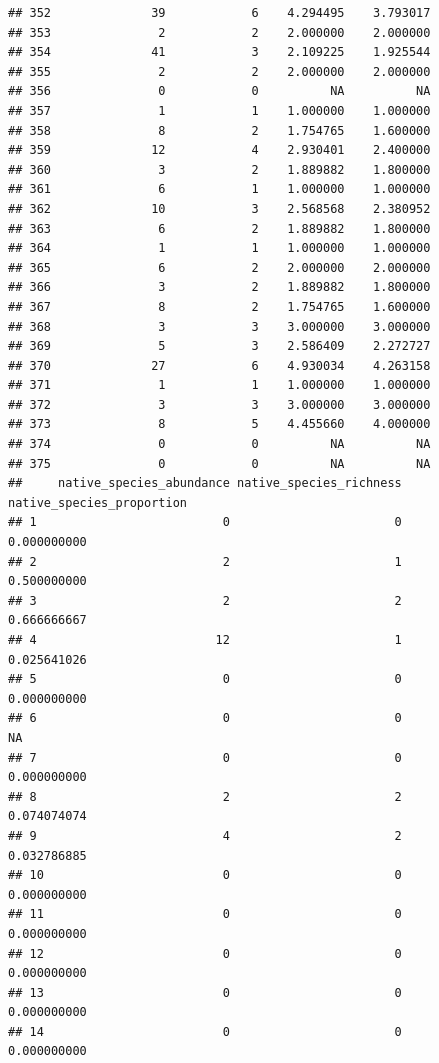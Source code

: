 \documentclass[
]{article}
\begin{document}
\begin{verbatim}
## 352              39            6    4.294495    3.793017
## 353               2            2    2.000000    2.000000
## 354              41            3    2.109225    1.925544
## 355               2            2    2.000000    2.000000
## 356               0            0          NA          NA
## 357               1            1    1.000000    1.000000
## 358               8            2    1.754765    1.600000
## 359              12            4    2.930401    2.400000
## 360               3            2    1.889882    1.800000
## 361               6            1    1.000000    1.000000
## 362              10            3    2.568568    2.380952
## 363               6            2    1.889882    1.800000
## 364               1            1    1.000000    1.000000
## 365               6            2    2.000000    2.000000
## 366               3            2    1.889882    1.800000
## 367               8            2    1.754765    1.600000
## 368               3            3    3.000000    3.000000
## 369               5            3    2.586409    2.272727
## 370              27            6    4.930034    4.263158
## 371               1            1    1.000000    1.000000
## 372               3            3    3.000000    3.000000
## 373               8            5    4.455660    4.000000
## 374               0            0          NA          NA
## 375               0            0          NA          NA
##     native_species_abundance native_species_richness native_species_proportion
## 1                          0                       0               0.000000000
## 2                          2                       1               0.500000000
## 3                          2                       2               0.666666667
## 4                         12                       1               0.025641026
## 5                          0                       0               0.000000000
## 6                          0                       0                        NA
## 7                          0                       0               0.000000000
## 8                          2                       2               0.074074074
## 9                          4                       2               0.032786885
## 10                         0                       0               0.000000000
## 11                         0                       0               0.000000000
## 12                         0                       0               0.000000000
## 13                         0                       0               0.000000000
## 14                         0                       0               0.000000000

\end{verbatim}
\end{document}
